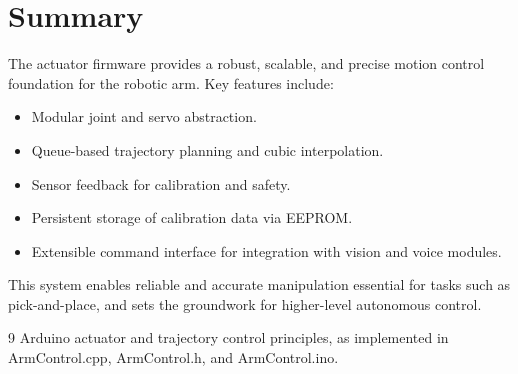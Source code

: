 \documentclass[12pt,a4paper]{report}
\begin{document}
\section{Summary}
The actuator firmware provides a robust, scalable, and precise motion control foundation for the robotic arm. Key features include:
\begin{itemize}
    \item Modular joint and servo abstraction.
    \item Queue-based trajectory planning and cubic interpolation.
    \item Sensor feedback for calibration and safety.
    \item Persistent storage of calibration data via EEPROM.
    \item Extensible command interface for integration with vision and voice modules.
\end{itemize}
This system enables reliable and accurate manipulation essential for tasks such as pick-and-place, and sets the groundwork for higher-level autonomous control.

\begin{thebibliography}{9}
 Arduino actuator and trajectory control principles, as implemented in ArmControl.cpp, ArmControl.h, and ArmControl.ino.
\end{thebibliography}
\end{document}
